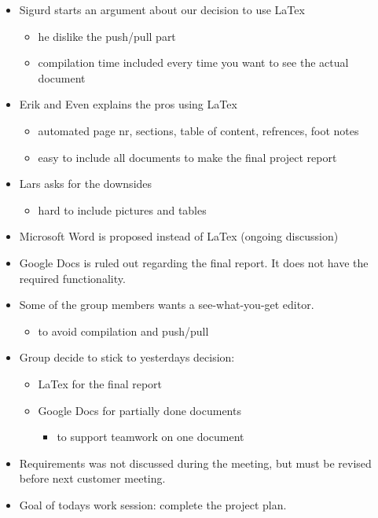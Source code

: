 \documentclass[a4paper, 11pt]{report}
\begin{document}
\begin{itemize}
\item Sigurd starts an argument about our decision to use LaTex
	\begin{itemize}
	\item he dislike the push/pull part
	\item compilation time included every time you want to see the actual document
	\end{itemize}
\item Erik and Even explains the pros using LaTex
	\begin{itemize}
	\item automated page nr, sections, table of content, refrences, foot notes
	\item easy to include all documents to make the final project report
	\end{itemize}
\item Lars asks for the downsides
	\begin{itemize}
	\item hard to include pictures and tables
	\end{itemize}
\item Microsoft Word is proposed instead of LaTex (ongoing discussion)
\item Google Docs is ruled out regarding the final report. It does not have the required functionality.
\item Some of the group members wants a see-what-you-get editor.
	\begin{itemize}
	\item to avoid compilation and push/pull
	\end{itemize}
\item Group decide to stick to yesterdays decision:
	\begin{itemize}
	\item LaTex for the final report
	\item Google Docs for partially done documents
		\begin{itemize}
		\item to support teamwork on one document
		\end{itemize}
	\end{itemize}
\item Requirements was not discussed during the meeting, but must be revised before next customer meeting. 
\item Goal of todays work session: complete the project plan.
\end{itemize}
\end{document}

